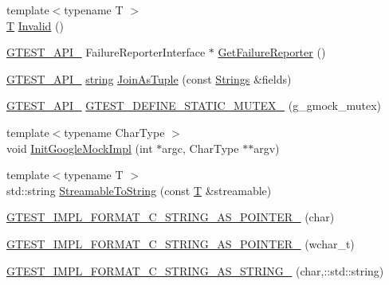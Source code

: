 \begin{DoxyCompactItemize}
\item 
{\footnotesize template$<$typename T $>$ }\\\hyperlink{functions__7_8js_adf1f3edb9115acb0a1e04209b7a9937b}{T} \hyperlink{namespacetesting_1_1internal_a3316c24e8a79f5def3e85d763ae50854}{Invalid} ()
\item 
\hyperlink{gtest-port_8h_aa73be6f0ba4a7456180a94904ce17790}{G\+T\+E\+S\+T\+\_\+\+A\+P\+I\+\_\+} Failure\+Reporter\+Interface $\ast$ \hyperlink{namespacetesting_1_1internal_aa261c22df383e9007129c92e36e30e62}{Get\+Failure\+Reporter} ()
\item 
\hyperlink{gtest-port_8h_aa73be6f0ba4a7456180a94904ce17790}{G\+T\+E\+S\+T\+\_\+\+A\+P\+I\+\_\+} \hyperlink{namespacetesting_1_1internal_a8e8ff5b11e64078831112677156cb111}{string} \hyperlink{namespacetesting_1_1internal_a61d60981533cb0875bad9025e0d98b74}{Join\+As\+Tuple} (const \hyperlink{namespacetesting_1_1internal_a7706b17f05f4b49e351b052ae4e05073}{Strings} \&fields)
\item 
\hyperlink{gtest-port_8h_aa73be6f0ba4a7456180a94904ce17790}{G\+T\+E\+S\+T\+\_\+\+A\+P\+I\+\_\+} \hyperlink{namespacetesting_1_1internal_a8c4aa7be8daa7b60e293071d70a89584}{G\+T\+E\+S\+T\+\_\+\+D\+E\+F\+I\+N\+E\+\_\+\+S\+T\+A\+T\+I\+C\+\_\+\+M\+U\+T\+E\+X\+\_\+} (g\+\_\+gmock\+\_\+mutex)
\item 
{\footnotesize template$<$typename Char\+Type $>$ }\\void \hyperlink{namespacetesting_1_1internal_a3823844199df88af9493026031cf7744}{Init\+Google\+Mock\+Impl} (int $\ast$argc, Char\+Type $\ast$$\ast$argv)
\item 
{\footnotesize template$<$typename T $>$ }\\std\+::string \hyperlink{namespacetesting_1_1internal_aad4beed95d0846e6ffc5da0978ef3bb9}{Streamable\+To\+String} (const \hyperlink{functions__7_8js_adf1f3edb9115acb0a1e04209b7a9937b}{T} \&streamable)
\item 
\hyperlink{namespacetesting_1_1internal_a3682f962ae0ec1c0eca6444ca0a09e91}{G\+T\+E\+S\+T\+\_\+\+I\+M\+P\+L\+\_\+\+F\+O\+R\+M\+A\+T\+\_\+\+C\+\_\+\+S\+T\+R\+I\+N\+G\+\_\+\+A\+S\+\_\+\+P\+O\+I\+N\+T\+E\+R\+\_\+} (char)
\item 
\hyperlink{namespacetesting_1_1internal_a85e08f00d443221e529a0a85a90fbaeb}{G\+T\+E\+S\+T\+\_\+\+I\+M\+P\+L\+\_\+\+F\+O\+R\+M\+A\+T\+\_\+\+C\+\_\+\+S\+T\+R\+I\+N\+G\+\_\+\+A\+S\+\_\+\+P\+O\+I\+N\+T\+E\+R\+\_\+} (wchar\+\_\+t)
\item 
\hyperlink{namespacetesting_1_1internal_a9dceb71a64d780beb2db1ed5bf24ad3f}{G\+T\+E\+S\+T\+\_\+\+I\+M\+P\+L\+\_\+\+F\+O\+R\+M\+A\+T\+\_\+\+C\+\_\+\+S\+T\+R\+I\+N\+G\+\_\+\+A\+S\+\_\+\+S\+T\+R\+I\+N\+G\+\_\+} (char,\+::std\+::string)
$$
\end{DoxyCompactItemize}
